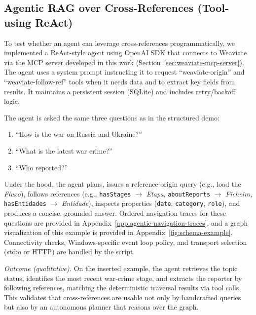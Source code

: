 \subsection{Agentic RAG over Cross-References (Tool-using ReAct)}
\label{subsec:agentic-xref}
To test whether an agent can leverage cross-references programmatically, we implemented a ReAct-style agent using OpenAI SDK that connects to Weaviate via the \gls{MCP} server developed in this work (Section~\ref{sec:weaviate-mcp-server}). The agent uses a system prompt instructing it to request \enquote{weaviate-origin} and \enquote{weaviate-follow-ref} tools when it needs data and to extract key fields from results. It maintains a persistent session (SQLite) and includes retry/backoff logic.

The agent is asked the same three questions as in the structured demo:
\begin{enumerate}
    \item \enquote{How is the war on Russia and Ukraine?}
    \item \enquote{What is the latest war crime?}
    \item \enquote{Who reported?}
\end{enumerate}
Under the hood, the agent plans, issues a reference-origin query (e.g., load the \textit{Fluxo}), follows references (e.g., \texttt{hasStages} \(\rightarrow\) \textit{Etapa}, \texttt{aboutReports} \(\rightarrow\) \textit{Ficheiro}, \texttt{hasEntidades} \(\rightarrow\) \textit{Entidade}), inspects properties (\texttt{date}, \texttt{category}, \texttt{role}), and produces a concise, grounded answer. Ordered navigation traces for these questions are provided in Appendix~\ref{app:agentic-navigation-traces}, and a graph visualization of this example is provided in Appendix~\ref{fig:schema-example}.
Connectivity checks, Windows-specific event loop policy, and transport selection (stdio or HTTP) are handled by the script.

\noindent\textit{Outcome (qualitative).} On the inserted example, the agent retrieves the topic status, identifies the most recent war-crime stage, and extracts the reporter by following references, matching the deterministic traversal results via tool calls. This validates that cross-references are usable not only by handcrafted queries but also by an autonomous planner that reasons over the graph.

